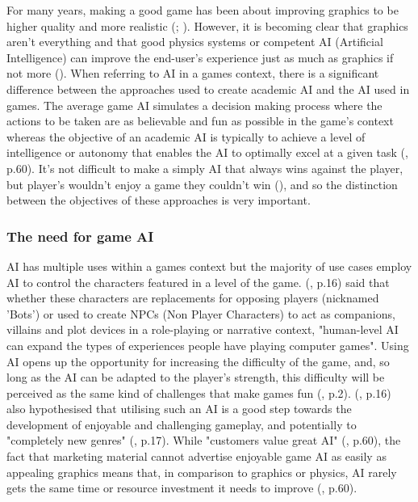 \documentclass[10pt]{article}
\begin{document}
For many years, making a good game has been about improving graphics to be higher quality and more realistic (\cite{yap2002grid}; \cite{blow2004game}). However, it is becoming clear that graphics aren't everything and that good physics systems or competent AI (Artificial Intelligence) can improve the end-user's experience just as much as graphics if not more (\cite{blow2004game}). When referring to AI in a games context, there is a significant difference between the approaches used to create academic AI and the AI used in games. The average game AI simulates a decision making process where the actions to be taken are as believable and fun as possible in the game's context whereas the objective of an academic AI is typically to achieve a level of intelligence or autonomy that enables the AI to optimally excel at a given task (\cite{nareyek2004ai}, p.60). It's not difficult to make a simply AI that always wins against the player, but player's wouldn't enjoy a game they couldn't win (\cite{tozour2002evolution}), and so the distinction between the objectives of these approaches is very important.

\subsubsection{The need for game AI}

AI has multiple uses within a games context but the majority of use cases employ AI to control the characters featured in a level of the game. \citeauthor{laird2001human} (\citeyear{laird2001human}, p.16) said that whether these characters are replacements for opposing players (nicknamed 'Bots') or used to create NPCs (Non Player Characters) to act as companions, villains and plot devices in a role-playing or narrative context, "human-level AI can expand the types of experiences people have playing computer games". Using AI opens up the opportunity for increasing the difficulty of the game, and, so long as the AI can be adapted to the player's strength, this difficulty will be perceived as the same kind of challenges that make games fun (\cite{buro2004call}, p.2). \citeauthor{laird2001human} (\citeyear{laird2001human}, p.16) also hypothesised that utilising such an AI is a good step towards the development of enjoyable and challenging gameplay, and potentially to "completely new genres" (\cite{laird2001human}, p.17). While "customers value great AI" (\cite{nareyek2004ai}, p.60), the fact that marketing material cannot advertise enjoyable game AI as easily as appealing graphics means that, in comparison to graphics or physics, AI rarely gets the same time or resource investment it needs to improve (\cite{nareyek2004ai}, p.60).
\end{document}
